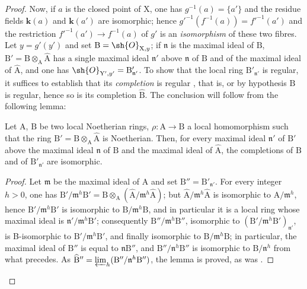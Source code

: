 \begin{proof}
Now, if $a$ is the closed point of $\mathrm{X}$, one has $g^{-1}(a)=\{a'\}$ and the residue fields $\boldsymbol{k}(a)$ and $\boldsymbol{k}(a')$ are isomorphic; hence $g'^{-1}(f^{-1}(a))=f'^{-1}(a')$ and the restriction $f'^{-1}(a')\to f^{-1}(a)$ of $g'$ is an \emph{isomorphism} of these two fibres. Let $y=g'(y')$ and set $\mathrm{B}=\sh{O}_{\mathrm{X},y}$; if $\mathfrak{n}$ is the maximal ideal of $\mathrm{B}$, $\mathrm{B}'=\mathrm{B}\otimes_\mathrm{A}\widehat{\mathrm{A}}$ has a single maximal ideal $\mathfrak{n}'$ above $\mathfrak{n}$ of $\mathrm{B}$ and of the maximal ideal of $\widehat{\mathrm{A}}$, and one has $\sh{O}_{\mathrm{Y}',y'}=\mathrm{B}'_{\mathfrak{n}'}$. To show that the local ring $\mathrm{B}'_{\mathfrak{n}'}$ is regular, it suffices to establish that its \emph{completion} is regular , that is, or by hypothesis $\mathrm{B}$ is regular, hence so is its completion $\widehat{\mathrm{B}}$. The conclusion will follow from the following lemma:

\begin{lemma}[7.9.3.1]
\label{IV.7.9.3.1}
Let $\mathrm{A}$, $\mathrm{B}$ be two local Noetherian rings, $\rho:\mathrm{A}\to\mathrm{B}$ a local homomorphism such that the ring $\mathrm{B}'=\mathrm{B}\otimes_\mathrm{A}\widehat{\mathrm{A}}$ is Noetherian. Then, for every maximal ideal $\mathfrak{n}'$ of $\mathrm{B}'$ above the maximal ideal $\mathfrak{n}$ of $\mathrm{B}$ and the maximal ideal of $\widehat{\mathrm{A}}$, the completions of $\mathrm{B}$ and of $\mathrm{B}'_{\mathfrak{n}'}$ are isomorphic.
\end{lemma}

\begin{proof}
Let $\mathfrak{m}$ be the maximal ideal of $\mathrm{A}$ and set $\mathrm{B}''=\mathrm{B}'_{\mathfrak{n}'}$. For every integer $h>0$, one has $\mathrm{B}'/\mathfrak{m}^h\mathrm{B}'=\mathrm{B}\otimes_\mathrm{A}(\widehat{\mathrm{A}}/\mathfrak{m}^h\widehat{\mathrm{A}})$; but $\widehat{\mathrm{A}}/\mathfrak{m}^h\widehat{\mathrm{A}}$ is isomorphic to $\mathrm{A}/\mathfrak{m}^h$, hence $\mathrm{B}'/\mathfrak{m}^h\mathrm{B}'$ is isomorphic to $\mathrm{B}/\mathfrak{m}^h\mathrm{B}$, and in particular it is a local ring whose maximal ideal is $\mathfrak{n}'/\mathfrak{m}^h\mathrm{B}'$; consequently $\mathrm{B}''/\mathfrak{m}^h\mathrm{B}''$, isomorphic to $(\mathrm{B}'/\mathfrak{m}^h\mathrm{B}')_{\mathfrak{n}'}$, is B-isomorphic to $\mathrm{B}'/\mathfrak{m}^h\mathrm{B}'$, and finally isomorphic to $\mathrm{B}/\mathfrak{m}^h\mathrm{B}$; in particular, the maximal ideal of $\mathrm{B}''$ is equal to $\mathfrak{n}\mathrm{B}''$, and $\mathrm{B}''/\mathfrak{n}^h\mathrm{B}''$ is isomorphic to $\mathrm{B}/\mathfrak{n}^h$ from what precedes. As $\widehat{\mathrm{B}}''=\varprojlim_h(\mathrm{B}''/\mathfrak{n}^h\mathrm{B}'')$, the lemma is proved, as was .
\end{proof}
\end{proof}


